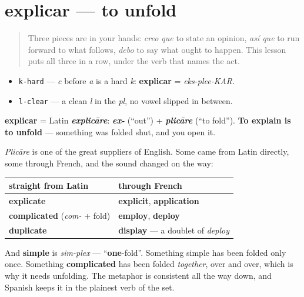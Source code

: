 \section[explicar]{explicar — to unfold}

\label{lesson:ES-C41-explicar}



\begin{quote}
Three pieces are in your hands: \emph{creo que} to state an opinion, \emph{así que} to run forward to what follows, \emph{debo} to say what ought to happen. This lesson puts all three in a row, under the verb that names the act.
\end{quote}

\begin{sounds}
\begin{itemize}
\raggedright
  \item \texttt{k-hard} — \emph{c} before \emph{a} is a hard \emph{k}: \textbf{explicar} = \emph{eks-plee-KAR}.
  \item \texttt{l-clear} — a clean \emph{l} in the \emph{pl}, no vowel slipped in between.
\end{itemize}
\end{sounds}

\begin{cousinweb}
\textbf{explicar} = Latin \emph{\textbf{explicāre}}: \emph{\textbf{ex-}} (\textquotedblleft{}out\textquotedblright{}) + \emph{\textbf{plicāre}} (\textquotedblleft{}to fold\textquotedblright{}). \textbf{To explain is to unfold} — something was folded shut, and you open it.

\emph{Plicāre} is one of the great suppliers of English. Some came from Latin directly, some through French, and the sound changed on the way:

\noindent
\begin{tabularx}{\linewidth}{@{}>{\raggedright\arraybackslash}X>{\raggedright\arraybackslash}X@{}}
\toprule
\textbf{straight from Latin} & \textbf{through French} \\
\midrule
\textbf{explicate} & \textbf{explicit}, \textbf{application} \\
\textbf{complicated} (\emph{com-} + fold) & \textbf{employ}, \textbf{deploy} \\
\textbf{duplicate} & \textbf{display} — a doublet of \emph{deploy} \\
\bottomrule
\end{tabularx}

And \textbf{simple} is \emph{sim-plex} — \textquotedblleft{}\textbf{one}-fold\textquotedblright{}. Something simple has been folded only once. Something \textbf{complicated} has been folded \emph{together}, over and over, which is why it needs unfolding. The metaphor is consistent all the way down, and Spanish keeps it in the plainest verb of the set.
\end{cousinweb}

